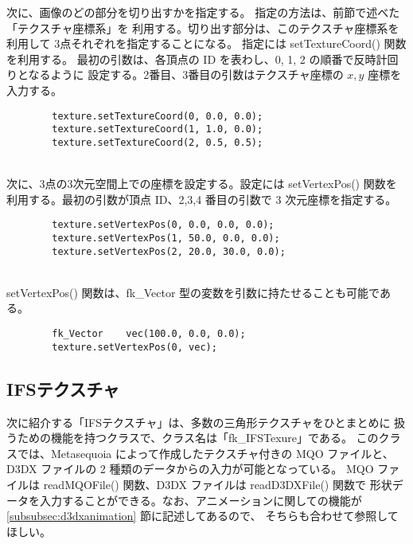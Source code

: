 次に、画像のどの部分を切り出すかを指定する。
指定の方法は、前節で述べた「テクスチャ座標系」を
利用する。切り出す部分は、このテクスチャ座標系を利用して
3点それぞれを指定することになる。
指定には setTextureCoord() 関数を利用する。
最初の引数は、各頂点の ID を表わし、0, 1, 2 の順番で反時計回りとなるように
設定する。2番目、3番目の引数はテクスチャ座標の \(x, y\) 座標を入力する。
\\
\begin{screen}
\begin{verbatim}
        texture.setTextureCoord(0, 0.0, 0.0);
        texture.setTextureCoord(1, 1.0, 0.0);
        texture.setTextureCoord(2, 0.5, 0.5);
\end{verbatim}
\end{screen}
~ \\
次に、3点の3次元空間上での座標を設定する。設定には setVertexPos() 関数を
利用する。最初の引数が頂点 ID、2,3,4 番目の引数で 3 次元座標を指定する。
\\
\begin{screen}
\begin{verbatim}
        texture.setVertexPos(0, 0.0, 0.0, 0.0);
        texture.setVertexPos(1, 50.0, 0.0, 0.0);
        texture.setVertexPos(2, 20.0, 30.0, 0.0);
\end{verbatim}
\end{screen}
~ \\
setVertexPos() 関数は、fk\_Vector 型の変数を引数に持たせることも可能である。
\\
\begin{screen}
\begin{verbatim}
        fk_Vector    vec(100.0, 0.0, 0.0);
        texture.setVertexPos(0, vec);
\end{verbatim}
\end{screen}

\subsection{IFSテクスチャ} \label{subsubsec:ifstexture}
次に紹介する「IFSテクスチャ」は、多数の三角形テクスチャをひとまとめに
扱うための機能を持つクラスで、クラス名は「fk\_IFSTexure」である。
このクラスでは、Metasequoia によって作成したテクスチャ付きの MQO ファイルと、
D3DX ファイルの 2 種類のデータからの入力が可能となっている。
MQO ファイルは readMQOFile() 関数、D3DX ファイルは readD3DXFile() 関数で
形状データを入力することができる。なお、アニメーションに関しての機能が
\ref{subsubsec:d3dxanimation} 節に記述してあるので、
そちらも合わせて参照してほしい。

